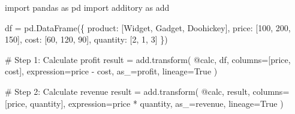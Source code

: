 \documentclass[
  letterpaper,
]{scrbook}
\newenvironment{Shaded}{\begin{snugshade}}{\end{snugshade}}
\newcommand{\CommentTok}[1]{\textcolor[rgb]{0.37,0.37,0.37}{#1}}
\newcommand{\DecValTok}[1]{\textcolor[rgb]{0.68,0.00,0.00}{#1}}
\newcommand{\ImportTok}[1]{\textcolor[rgb]{0.00,0.46,0.62}{#1}}
\newcommand{\NormalTok}[1]{\textcolor[rgb]{0.00,0.23,0.31}{#1}}
\newcommand{\OperatorTok}[1]{\textcolor[rgb]{0.37,0.37,0.37}{#1}}
\newcommand{\StringTok}[1]{\textcolor[rgb]{0.13,0.47,0.30}{#1}}
\newcommand{\VariableTok}[1]{\textcolor[rgb]{0.07,0.07,0.07}{#1}}
\begin{document}
\begin{Shaded}
\begin{Highlighting}[]
\ImportTok{import}\NormalTok{ pandas }\ImportTok{as}\NormalTok{ pd}
\ImportTok{import}\NormalTok{ additory }\ImportTok{as}\NormalTok{ add}

\NormalTok{df }\OperatorTok{=}\NormalTok{ pd.DataFrame(\{}
    \StringTok{\textquotesingle{}product\textquotesingle{}}\NormalTok{: [}\StringTok{\textquotesingle{}Widget\textquotesingle{}}\NormalTok{, }\StringTok{\textquotesingle{}Gadget\textquotesingle{}}\NormalTok{, }\StringTok{\textquotesingle{}Doohickey\textquotesingle{}}\NormalTok{],}
    \StringTok{\textquotesingle{}price\textquotesingle{}}\NormalTok{: [}\DecValTok{100}\NormalTok{, }\DecValTok{200}\NormalTok{, }\DecValTok{150}\NormalTok{],}
    \StringTok{\textquotesingle{}cost\textquotesingle{}}\NormalTok{: [}\DecValTok{60}\NormalTok{, }\DecValTok{120}\NormalTok{, }\DecValTok{90}\NormalTok{],}
    \StringTok{\textquotesingle{}quantity\textquotesingle{}}\NormalTok{: [}\DecValTok{2}\NormalTok{, }\DecValTok{1}\NormalTok{, }\DecValTok{3}\NormalTok{]}
\NormalTok{\})}

\CommentTok{\# Step 1: Calculate profit}
\NormalTok{result }\OperatorTok{=}\NormalTok{ add.transform(}
    \StringTok{\textquotesingle{}@calc\textquotesingle{}}\NormalTok{,}
\NormalTok{    df,}
\NormalTok{    columns}\OperatorTok{=}\NormalTok{[}\StringTok{\textquotesingle{}price\textquotesingle{}}\NormalTok{, }\StringTok{\textquotesingle{}cost\textquotesingle{}}\NormalTok{],}
\NormalTok{    expression}\OperatorTok{=}\StringTok{\textquotesingle{}price {-} cost\textquotesingle{}}\NormalTok{,}
\NormalTok{    as\_}\OperatorTok{=}\StringTok{\textquotesingle{}profit\textquotesingle{}}\NormalTok{,}
\NormalTok{    lineage}\OperatorTok{=}\VariableTok{True}
\NormalTok{)}

\CommentTok{\# Step 2: Calculate revenue}
\NormalTok{result }\OperatorTok{=}\NormalTok{ add.transform(}
    \StringTok{\textquotesingle{}@calc\textquotesingle{}}\NormalTok{,}
\NormalTok{    result,}
\NormalTok{    columns}\OperatorTok{=}\NormalTok{[}\StringTok{\textquotesingle{}price\textquotesingle{}}\NormalTok{, }\StringTok{\textquotesingle{}quantity\textquotesingle{}}\NormalTok{],}
\NormalTok{    expression}\OperatorTok{=}\StringTok{\textquotesingle{}price * quantity\textquotesingle{}}\NormalTok{,}
\NormalTok{    as\_}\OperatorTok{=}\StringTok{\textquotesingle{}revenue\textquotesingle{}}\NormalTok{,}
\NormalTok{    lineage}\OperatorTok{=}\VariableTok{True}
\NormalTok{)}


\end{Highlighting}
\end{Shaded}
\end{document}
